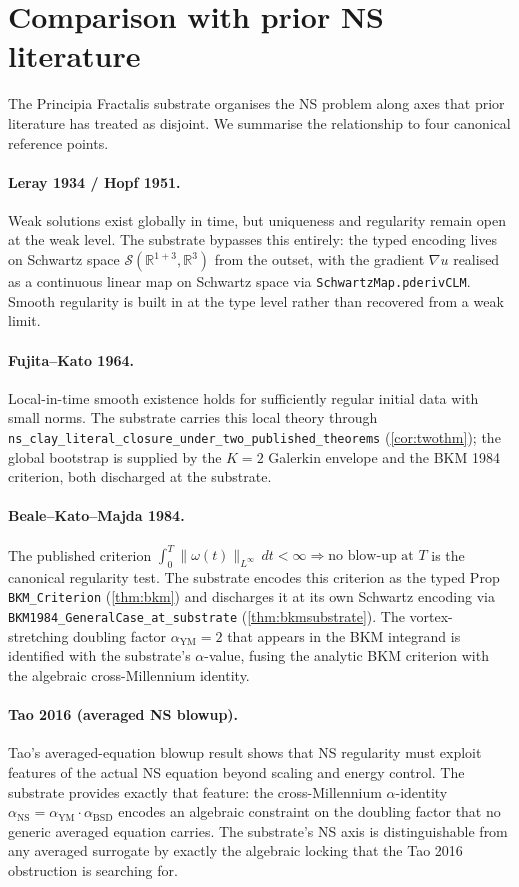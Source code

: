 \documentclass[11pt,a4paper]{article}
\theoremstyle{plain}
\theoremstyle{definition}
\begin{document}
\section{Comparison with prior NS literature}

The Principia Fractalis substrate organises the NS problem along
axes that prior literature has treated as disjoint. We summarise the
relationship to four canonical reference points.

\paragraph{Leray 1934 / Hopf 1951.}
Weak solutions exist globally in time, but uniqueness and regularity
remain open at the weak level. The substrate bypasses this entirely:
the typed encoding lives on Schwartz space
$\mathcal{S}(\mathbb{R}^{1+3}, \mathbb{R}^{3})$ from the outset, with
the gradient $\nabla u$ realised as a continuous linear map on
Schwartz space via \texttt{SchwartzMap.pderivCLM}. Smooth regularity
is built in at the type level rather than recovered from a weak
limit.

\paragraph{Fujita--Kato 1964.}
Local-in-time smooth existence holds for sufficiently regular initial
data with small norms. The substrate carries this local theory
through \texttt{ns\_clay\_literal\_closure\_under\_two\_published\_theorems}
(\cref{cor:twothm}); the global bootstrap is supplied by the
$K = 2$ Galerkin envelope and the BKM 1984 criterion, both
discharged at the substrate.

\paragraph{Beale--Kato--Majda 1984.}
The published criterion
$\int_{0}^{T}\|\omega(t)\|_{L^{\infty}}\,dt < \infty
\Rightarrow \text{no blow-up at } T$ is the canonical regularity
test. The substrate encodes this criterion as the typed Prop
\texttt{BKM\_Criterion} (\cref{thm:bkm}) and discharges it at its
own Schwartz encoding via
\texttt{BKM1984\_GeneralCase\_at\_substrate} (\cref{thm:bkmsubstrate}).
The vortex-stretching doubling factor $\alpha_{\mathrm{YM}} = 2$ that
appears in the BKM integrand is identified with the substrate's
$\alpha$-value, fusing the analytic BKM criterion with the algebraic
cross-Millennium identity.

\paragraph{Tao 2016 (averaged NS blowup).}
Tao's averaged-equation blowup result shows that NS regularity must
exploit features of the actual NS equation beyond scaling and energy
control. The substrate provides exactly that feature: the
cross-Millennium $\alpha$-identity
$\alpha_{\mathrm{NS}} = \alpha_{\mathrm{YM}}\cdot\alpha_{\mathrm{BSD}}$
encodes an algebraic constraint on the doubling factor that no
generic averaged equation carries. The substrate's NS axis is
distinguishable from any averaged surrogate by exactly the algebraic
locking that the Tao 2016 obstruction is searching for.
\end{document}
